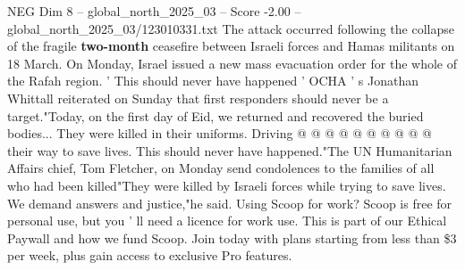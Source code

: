 \begin{textsample}{NEG Dim 8 – global\_north\_2025\_03 – Score -2.00 – global\_north\_2025\_03/123010331.txt}
The attack occurred following the collapse of the fragile \textbf{two-month} ceasefire between Israeli forces and Hamas militants on 18 March.
On Monday, Israel issued a new mass evacuation order for the whole of the Rafah region. ' This should never have happened ' OCHA ' s Jonathan Whittall reiterated on Sunday that first responders should never be a target."Today, on the first day of Eid, we returned and recovered the buried bodies...
They were killed in their uniforms.
Driving @ @ @ @ @ @ @ @ @ @ their way to save lives.
This should never have happened."The UN Humanitarian Affairs chief, Tom Fletcher, on Monday send condolences to the families of all who had been killed"They were killed by Israeli forces while trying to save lives.
We demand answers and justice,"he said.
Using Scoop for work?
Scoop is free for personal use, but you ' ll need a licence for work use.
This is part of our Ethical Paywall and how we fund Scoop.
Join today with plans starting from less than \$3 per week, plus gain access to exclusive Pro features.

\end{textsample}
